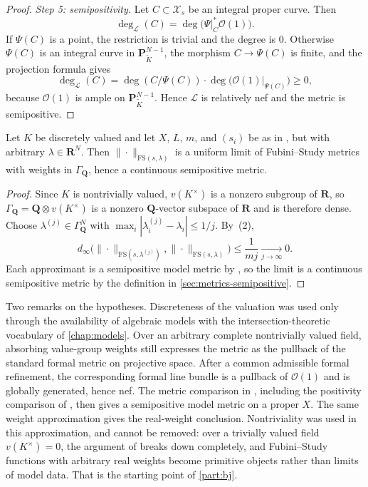 \begin{proof}
\emph{Step 5: semipositivity.} Let $C\subset\mathcal X_s$ be an integral
proper curve. Then
\[
 \deg_{\mathcal L}(C)=\deg\bigl(\Psi|_C^*\mathcal O(1)\bigr).
\]
If $\Psi(C)$ is a point, the restriction is trivial and the degree is
$0$. Otherwise $\Psi(C)$ is an integral curve in
$\mathbf P^{N-1}_{\widetilde K}$, the morphism $C\to\Psi(C)$ is
finite, and the projection formula gives
\[
 \deg_{\mathcal L}(C)
 =\deg(C/\Psi(C))\cdot\deg\bigl(\mathcal O(1)|_{\Psi(C)}\bigr)\ge0,
\]
because $\mathcal O(1)$ is ample on
$\mathbf P^{N-1}_{\widetilde K}$. Hence
$\mathcal L$ is relatively nef and the metric is semipositive.
\end{proof}

\begin{proposition}
\label{prop:metrics-fs-real-weights}
Let $K$ be discretely valued and let $X$, $L$, $m$, and
$(s_i)$ be as in , but with arbitrary
$\lambda\in\mathbf R^N$. Then
$\|\cdot\|_{\mathrm{FS}(s,\lambda)}$ is a uniform limit of Fubini--Study
metrics with weights in $\Gamma_{\mathbf Q}$, hence a continuous
semipositive metric.
\end{proposition}

\begin{proof}
Since $K$ is nontrivially valued, $v(K^\times)$ is a nonzero subgroup of
$\mathbf R$, so $\Gamma_{\mathbf Q}=\mathbf Q\otimes v(K^\times)$ is a
nonzero $\mathbf Q$-vector subspace of $\mathbf R$ and is therefore
dense. Choose $\lambda^{(j)}\in\Gamma_{\mathbf Q}^N$ with
$\max_i|\lambda_i^{(j)}-\lambda_i|\le1/j$. By
\,(2),
\[
 d_\infty\bigl(\|\cdot\|_{\mathrm{FS}(s,\lambda^{(j)})},
 \|\cdot\|_{\mathrm{FS}(s,\lambda)}\bigr)\le\frac1{mj}
 \xrightarrow[j\to\infty]{}0 .
\]
Each approximant is a semipositive model metric by
, so the limit is a continuous semipositive
metric by the definition in \cref{sec:metrics-semipositive}.
\end{proof}

Two remarks on the hypotheses. Discreteness of the valuation was used only
through the availability of algebraic models with the intersection-theoretic
vocabulary of \cref{chap:models}. Over an arbitrary complete nontrivially
valued field, absorbing value-group weights still expresses the metric
as the pullback of the standard formal metric on projective space.
After a common admissible formal refinement, the corresponding formal
line bundle is a pullback of $\mathcal O(1)$ and is globally generated,
hence nef. The metric comparison in
, including the positivity comparison of
\cite[Theorem~1.1]{GM19}, then gives a semipositive model metric on a
proper $X$. The same weight approximation gives the real-weight conclusion.
Nontriviality was used in this approximation, and cannot be
removed: over a trivially valued field $v(K^\times)=0$, the argument of
 breaks down completely, and
Fubini--Study functions with arbitrary real weights become primitive objects
rather than limits of model data. That is the starting point of
\cref{part:bj}.

